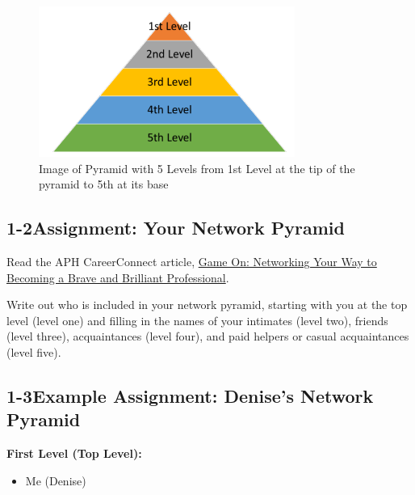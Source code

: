 \begin{figure}[H]
    \centering
    \includegraphics[width=1\linewidth]{images/NetworkPyramid.png}
    \caption{Image of Pyramid with 5 Levels from 1st Level at the tip of the pyramid to 5th at its base}
\end{figure}


\pagebreak \subsection*{1-2\quad Assignment: Your Network Pyramid}
Read the APH CareerConnect article, \href{https://aphconnectcenter.org/careerconnect-blog/networking-your-way-to-becoming-a-brave-and-brilliant-professional/}{Game On: Networking Your Way to Becoming a Brave and Brilliant Professional}.

Write out who is included in your network pyramid, starting with you at the top level (level one) and filling in the names of your intimates (level two), friends (level three), acquaintances (level four), and paid helpers or casual acquaintances (level five).

\pagebreak \subsection*{1-3\quad Example Assignment: Denise's Network Pyramid}
\textbf{First Level (Top Level):} 
\begin{itemize}[leftmargin=*]
\item Me (Denise)
\end{itemize}

